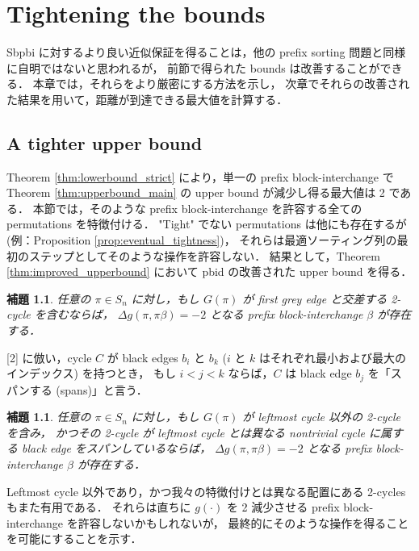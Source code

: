\documentclass[paper=a4,fontsize=11pt,report,oneside]{jlreq}
\newtheorem{lemma}[theorem]{補題}
\begin{document}
\chapter{Tightening the bounds}

Sbpbi に対するより良い近似保証を得ることは，他の prefix sorting 問題と同様に自明ではないと思われるが，
前節で得られた bounds は改善することができる．
本章では，それらをより厳密にする方法を示し，
次章でそれらの改善された結果を用いて，距離が到達できる最大値を計算する．

\section{A tighter upper bound}

Theorem \ref{thm:lowerbound_strict} により，単一の prefix block-interchange で
Theorem \ref{thm:upperbound_main} の upper bound が減少し得る最大値は 2 である．
本節では，そのような prefix block-interchange を許容する全ての permutations を特徴付ける．
"Tight" でない permutations は他にも存在するが (例：Proposition \ref{prop:eventual_tightness})，
それらは最適ソーティング列の最初のステップとしてそのような操作を許容しない．
結果として，Theorem \ref{thm:improved_upperbound} において pbid の改善された upper bound を得る．

\begin{lemma} \label{lem:2cycle_intersect_grey}
    任意の $\pi \in S_n$ に対し，もし $G(\pi)$ が first grey edge と交差する 2-cycle を含むならば，
    $\Delta g(\pi, \pi\beta) = -2$ となる prefix block-interchange $\beta$ が存在する．
\end{lemma}


[2] に倣い，cycle $C$ が black edges $b_i$ と $b_k$ ($i$ と $k$ はそれぞれ最小および最大のインデックス) を持つとき，
もし $i < j < k$ ならば，$C$ は black edge $b_j$ を「スパンする (spans)」と言う．

\begin{lemma} \label{lem:2cycle_spans_other}
    任意の $\pi \in S_n$ に対し，もし $G(\pi)$ が leftmost cycle 以外の 2-cycle を含み，
    かつその 2-cycle が leftmost cycle とは異なる nontrivial cycle に属する black edge をスパンしているならば，
    $\Delta g(\pi, \pi\beta) = -2$ となる prefix block-interchange $\beta$ が存在する．
\end{lemma}


Leftmost cycle 以外であり，かつ我々の特徴付けとは異なる配置にある 2-cycles もまた有用である．
それらは直ちに $g(\cdot)$ を 2 減少させる prefix block-interchange を許容しないかもしれないが，
最終的にそのような操作を得ることを可能にすることを示す．
\end{document}

